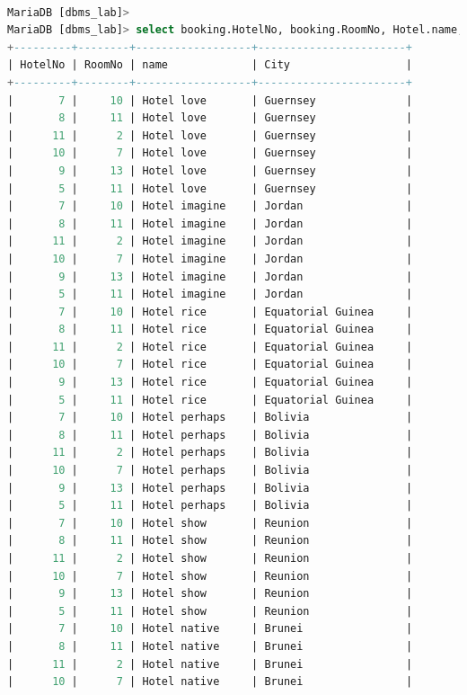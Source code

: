 \documentclass[11pt]{article}
\begin{document}
\begin{lstlisting}[language=sql]

MariaDB [dbms_lab]>
MariaDB [dbms_lab]> select booking.HotelNo, booking.RoomNo, Hotel.name, Hotel.City from booking cross join Hotel;
+---------+--------+------------------+-----------------------+
| HotelNo | RoomNo | name             | City                  |
+---------+--------+------------------+-----------------------+
|       7 |     10 | Hotel love       | Guernsey              |
|       8 |     11 | Hotel love       | Guernsey              |
|      11 |      2 | Hotel love       | Guernsey              |
|      10 |      7 | Hotel love       | Guernsey              |
|       9 |     13 | Hotel love       | Guernsey              |
|       5 |     11 | Hotel love       | Guernsey              |
|       7 |     10 | Hotel imagine    | Jordan                |
|       8 |     11 | Hotel imagine    | Jordan                |
|      11 |      2 | Hotel imagine    | Jordan                |
|      10 |      7 | Hotel imagine    | Jordan                |
|       9 |     13 | Hotel imagine    | Jordan                |
|       5 |     11 | Hotel imagine    | Jordan                |
|       7 |     10 | Hotel rice       | Equatorial Guinea     |
|       8 |     11 | Hotel rice       | Equatorial Guinea     |
|      11 |      2 | Hotel rice       | Equatorial Guinea     |
|      10 |      7 | Hotel rice       | Equatorial Guinea     |
|       9 |     13 | Hotel rice       | Equatorial Guinea     |
|       5 |     11 | Hotel rice       | Equatorial Guinea     |
|       7 |     10 | Hotel perhaps    | Bolivia               |
|       8 |     11 | Hotel perhaps    | Bolivia               |
|      11 |      2 | Hotel perhaps    | Bolivia               |
|      10 |      7 | Hotel perhaps    | Bolivia               |
|       9 |     13 | Hotel perhaps    | Bolivia               |
|       5 |     11 | Hotel perhaps    | Bolivia               |
|       7 |     10 | Hotel show       | Reunion               |
|       8 |     11 | Hotel show       | Reunion               |
|      11 |      2 | Hotel show       | Reunion               |
|      10 |      7 | Hotel show       | Reunion               |
|       9 |     13 | Hotel show       | Reunion               |
|       5 |     11 | Hotel show       | Reunion               |
|       7 |     10 | Hotel native     | Brunei                |
|       8 |     11 | Hotel native     | Brunei                |
|      11 |      2 | Hotel native     | Brunei                |
|      10 |      7 | Hotel native     | Brunei                |

\end{lstlisting}
\end{document}
